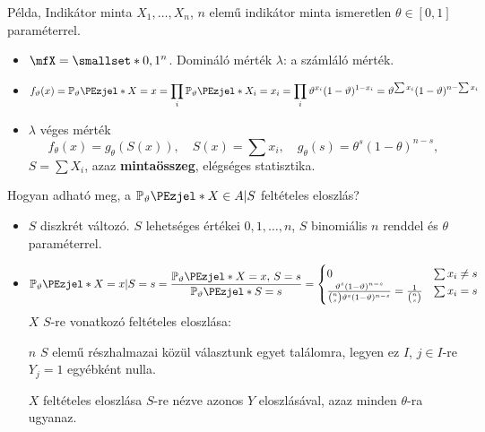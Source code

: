 \documentclass[aspectratio=169,notheorems,9pt,\option]{beamer}
\begin{document}
\begin{frame}{Példa, Indikátor minta}
  $X_1,\dots,X_n$, $n$ elemű indikátor minta ismeretlen $\theta\in[0,1]$ paraméterrel.
   \begin{itemize}
     \item $\mfX=\smallset*{0,1}^n$. Domináló mérték $\lambda$: a számláló mérték.
     \item 
      \begin{displaymath}
        f_\theta(x) = \P[\theta]{X=x} 
        = \prod_i \P[\theta]{X_i=x_i}
        =\prod_{i} \theta^{x_i}(1-\theta)^{1-x_i}
        =\theta^{\sum x_i}(1-\theta)^{n-\sum x_i}
     \end{displaymath}
     \item $\lambda$ véges mérték
      \begin{displaymath}
        f_\theta(x)=g_\theta(S(x)),\quad S(x)=\sum x_i,\quad g_\theta(s)=\theta^s(1-\theta)^{n-s},
      \end{displaymath}
      $S=\sum X_i$, azaz \textbf{mintaösszeg}, elégséges statisztika. 
   \end{itemize}
   \continue
   Hogyan adható meg, a $\P[\theta]{X\in A|S}$ feltételes eloszlás?
   \pause
   \begin{itemize}
     \item $S$ diszkrét változó. $S$ lehetséges értékei $0,1,\dots,n$, $S$ binomiális $n$ renddel és $\theta$ paraméterrel.
     \item 
      \begin{displaymath}
        \P[\theta]{X=x|S=s}=
        \frac{\P[\theta]{X=x,\,S=s}}{\P[\theta]{S=s}}=
        \begin{cases}
          0& \sum x_i\neq s\\
          \frac{\theta^s(1-\theta)^{n-s}}{\binom ns \theta^s(1-\theta)^{n-s}}=\frac1{\binom ns} & \sum x_i=s 
        \end{cases}
      \end{displaymath}
      \continue
      $X$ $S$-re vonatkozó feltételes eloszlása: 
        
      $n$ $S$ elemű részhalmazai közül választunk egyet találomra, legyen ez $I$,
      $j\in I$-re $Y_j=1$ egyébként nulla. 
      
      \pause
      $X$ feltételes eloszlása $S$-re nézve azonos $Y$ eloszlásával, azaz minden $\theta$-ra ugyanaz.
   \end{itemize}
\end{frame}
\end{document}
